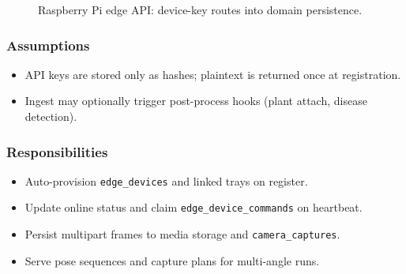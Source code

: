 \begin{figure}[H]
\centering
{}
\caption{Raspberry Pi edge API: device-key routes into domain persistence.}
\label{fig:app-rpi}
\end{figure}

\subsubsection{Assumptions}
\begin{itemize}
  \item API keys are stored only as hashes; plaintext is returned once at registration.
  \item Ingest may optionally trigger post-process hooks (plant attach, disease detection).
\end{itemize}

\subsubsection{Responsibilities}
\begin{itemize}
  \item Auto-provision \texttt{edge\_devices} and linked trays on register.
  \item Update online status and claim \texttt{edge\_device\_commands} on heartbeat.
  \item Persist multipart frames to media storage and \texttt{camera\_captures}.
  \item Serve pose sequences and capture plans for multi-angle runs.
\end{itemize}

